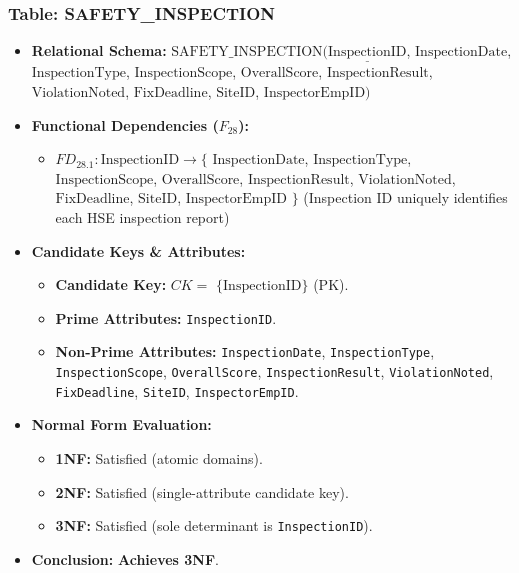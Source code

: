 \documentclass[a4paper,12pt]{report}
\providecommand{\tightlist}{%
  \setlength{\itemsep}{0pt}\setlength{\parskip}{0pt}}
\begin{document}
\subsubsection{\texorpdfstring{Table: SAFETY\_\allowbreak{}INSPECTION}{Table: SAFETYINSPECTION}}\label{table-safety_inspection}

\begin{itemize}
\item
  \textbf{Relational Schema:} \(\text{SAFETY\_INSPECTION}(\underline{\text{InspectionID}}\), \(\text{InspectionDate}\), \(\text{InspectionType}\), \(\text{InspectionScope}\), \(\text{OverallScore}\), \(\text{InspectionResult}\), \(\text{ViolationNoted}\), \(\text{FixDeadline}\), \(\text{SiteID}\), \(\text{InspectorEmpID})\)
\item
  \textbf{Functional Dependencies (\(F_{28}\)):}

  \begin{itemize}
  \tightlist
  \item
    \(FD_{28.1}: \text{InspectionID} \rightarrow \{\) \(\text{InspectionDate}\), \(\text{InspectionType}\), \(\text{InspectionScope}\), \(\text{OverallScore}\), \(\text{InspectionResult}\), \(\text{ViolationNoted}\), \(\text{FixDeadline}\), \(\text{SiteID}\), \(\text{InspectorEmpID}\) \(\}\) (Inspection ID uniquely identifies each HSE inspection report)
  \end{itemize}
\item
  \textbf{Candidate Keys \& Attributes:}

  \begin{itemize}
  \item
    \textbf{Candidate Key:} \(CK =\) \(\{\text{InspectionID}\}\) (PK).
  \item
    \textbf{Prime Attributes:} \texttt{InspectionID}.
  \item
    \textbf{Non-Prime Attributes:} \texttt{InspectionDate}, \texttt{InspectionType}, \texttt{InspectionScope}, \texttt{OverallScore}, \texttt{InspectionResult}, \texttt{ViolationNoted}, \texttt{FixDeadline}, \texttt{SiteID}, \texttt{InspectorEmpID}.
  \end{itemize}
\item
  \textbf{Normal Form Evaluation:}

  \begin{itemize}
  \item
    \textbf{1NF:} Satisfied (atomic domains).
  \item
    \textbf{2NF:} Satisfied (single-attribute candidate key).
  \item
    \textbf{3NF:} Satisfied (sole determinant is \texttt{InspectionID}).
  \end{itemize}
\item
  \textbf{Conclusion:} \textbf{Achieves 3NF}.
\end{itemize}
\end{document}
